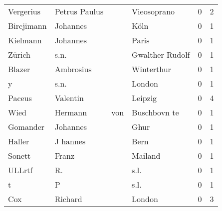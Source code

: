 \begin{center}
\begin{tiny}
\begin{longtabu}{llllrr}
                Vergerius &                      Petrus Paulus &             &                                 Vieosoprano &          0 &         2 \\
               Bircjimann &                           Johannes &             &                                        Köln &          0 &         1 \\
                 Kielmann &                           Johannes &             &                                       Paris &          0 &         1 \\
                   Zürich &                               s.n. &             &                             Gwalther Rudolf &          0 &         1 \\
                   Blazer &                          Ambrosius &             &                                  Winterthur &          0 &         1 \\
                        y &                               s.n. &             &                                      London &          0 &         1 \\
                   Paceus &                           Valentin &             &                                     Leipzig &          0 &         4 \\
                     Wied &                            Hermann &         von &                                Buschbovn te &          0 &         1 \\
                 Gomander &                           Johannes &             &                                        Ghur &          0 &         1 \\
                   Haller &                           J hannes &             &                                        Bern &          0 &         1 \\
                   Sonett &                              Franz &             &                                     Mailand &          0 &         1 \\
                   ULLrtf &                                 R. &             &                                        s.l. &          0 &         1 \\
                        t &                                  P &             &                                        s.l. &          0 &         1 \\
                      Cox &                            Richard &             &                                      London &          0 &         3 \\

\end{longtabu}
\end{tiny}
\end{center}
